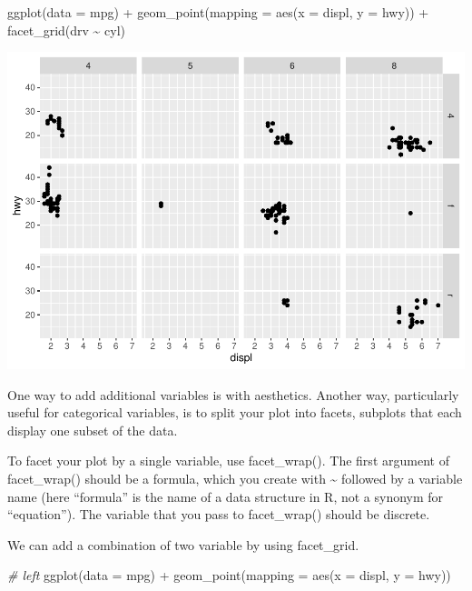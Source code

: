 \documentclass[
]{article}
\newenvironment{Shaded}{\begin{snugshade}}{\end{snugshade}}
\newcommand{\AttributeTok}[1]{\textcolor[rgb]{0.77,0.63,0.00}{#1}}
\newcommand{\CommentTok}[1]{\textcolor[rgb]{0.56,0.35,0.01}{\textit{#1}}}
\newcommand{\FunctionTok}[1]{\textcolor[rgb]{0.00,0.00,0.00}{#1}}
\newcommand{\NormalTok}[1]{#1}
\newcommand{\SpecialCharTok}[1]{\textcolor[rgb]{0.00,0.00,0.00}{#1}}
\begin{document}
\begin{Shaded}
\begin{Highlighting}[]
\FunctionTok{ggplot}\NormalTok{(}\AttributeTok{data =}\NormalTok{ mpg) }\SpecialCharTok{+} 
  \FunctionTok{geom\_point}\NormalTok{(}\AttributeTok{mapping =} \FunctionTok{aes}\NormalTok{(}\AttributeTok{x =}\NormalTok{ displ, }\AttributeTok{y =}\NormalTok{ hwy)) }\SpecialCharTok{+} 
  \FunctionTok{facet\_grid}\NormalTok{(drv }\SpecialCharTok{\textasciitilde{}}\NormalTok{ cyl)}
\end{Highlighting}
\end{Shaded}

\includegraphics{Journal_files/figure-latex/unnamed-chunk-40-2.pdf}

One way to add additional variables is with aesthetics. Another way,
particularly useful for categorical variables, is to split your plot
into facets, subplots that each display one subset of the data.

To facet your plot by a single variable, use facet\_wrap(). The first
argument of facet\_wrap() should be a formula, which you create with
\textasciitilde{} followed by a variable name (here ``formula'' is the
name of a data structure in R, not a synonym for ``equation''). The
variable that you pass to facet\_wrap() should be discrete.

We can add a combination of two variable by using facet\_grid.

\begin{Shaded}
\begin{Highlighting}[]
\CommentTok{\# left}
\FunctionTok{ggplot}\NormalTok{(}\AttributeTok{data =}\NormalTok{ mpg) }\SpecialCharTok{+} 
  \FunctionTok{geom\_point}\NormalTok{(}\AttributeTok{mapping =} \FunctionTok{aes}\NormalTok{(}\AttributeTok{x =}\NormalTok{ displ, }\AttributeTok{y =}\NormalTok{ hwy))}
\end{Highlighting}
\end{Shaded}
\end{document}
